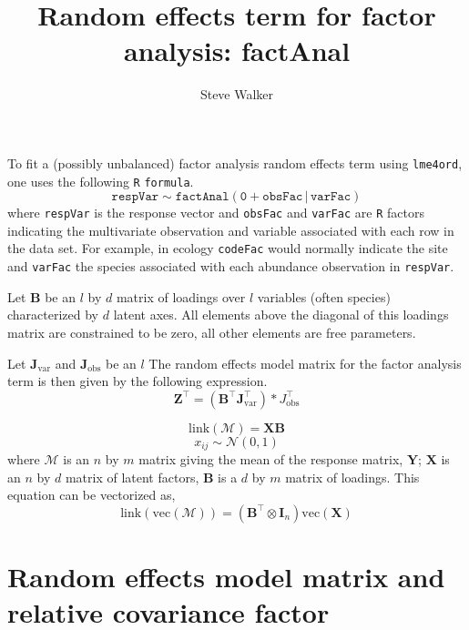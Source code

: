 \documentclass{article}\usepackage[]{graphicx}\usepackage[]{color}
\title{Random effects term for factor analysis: factAnal}
\author{Steve Walker}
\date{}
\newcommand{\trans}{^\top}
\newcommand{\link}{\ensuremath{\mathrm{link}}}
\newcommand{\mc}{\mathcal}
\newcommand{\vc}{\ensuremath{\mathrm{vec}}}
\newcommand{\code}[1]{\texttt{#1}}
\begin{document}
\maketitle

To fit a (possibly unbalanced) factor analysis random effects term
using \code{lme4ord}, one uses the following \code{R} \code{formula}.
\begin{equation}
  \label{eq:6}
  \mathtt{respVar \sim factAnal(0 + obsFac\, | \,varFac)}
\end{equation}
where \code{respVar} is the response vector and \code{obsFac} and
\code{varFac} are \code{R} factors indicating the multivariate
observation and variable associated with each row in the data set.
For example, in ecology \code{codeFac} would normally indicate the
site and \code{varFac} the species associated with each abundance
observation in \code{respVar}.

Let $\bm B$ be an $l$ by $d$ matrix of loadings over $l$ variables
(often species) characterized by $d$ latent axes. All elements above
the diagonal of this loadings matrix are constrained to be zero, all
other elements are free parameters.

Let $\bm
J_{\text{var}}$ and $\bm J_{\text{obs}}$ be an $l$ The random effects
model matrix for the factor analysis term is then given by the
following expression.
\begin{equation}
  \label{eq:5}
  \bm Z\trans = (\bm B\trans\bm J_{\text{var}}\trans) * J_{\text{obs}}\trans
\end{equation}

\newpage

\begin{equation}
  \label{eq:2}
  \link\left(\mc M\right) = 
  \bm X \bm B
\end{equation}
\begin{equation}
  \label{eq:3}
  x_{ij} \sim \mc N(0, 1)
\end{equation}
where $\mc M$ is an $n$ by $m$ matrix giving the mean of the response
matrix, $\bm Y$; $\bm X$ is an $n$ by $d$ matrix of latent factors,
$\bm B$ is a $d$ by $m$ matrix of loadings.  This equation can be
vectorized as,
\begin{equation}
  \label{eq:4}
  \link\left(\vc(\mc M)\right) = 
  \left(\bm B\trans \otimes \bm I_n\right)
  \vc(\bm X)
\end{equation}

\section{Random effects model matrix and relative covariance factor}
\end{document}
